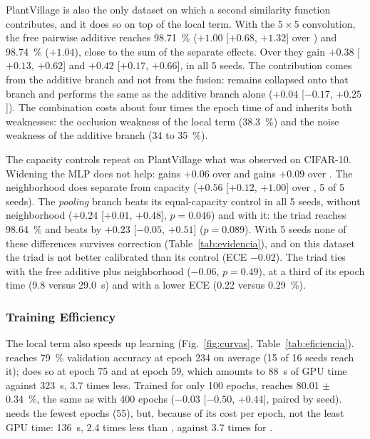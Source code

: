 PlantVillage is also the only dataset on which a second similarity function contributes, and it does so on top of the local term. With the $5\times5$ convolution, the free pairwise additive reaches 98.71~\% ($+1.00$ [$+0.68$, $+1.32$] over ) and  98.74~\% ($+1.04$), close to the sum of the separate effects. Over  they gain $+0.38$ [$+0.13$, $+0.62$] and $+0.42$ [$+0.17$, $+0.66$], in all 5 seeds. The contribution comes from the additive branch and not from the fusion:  remains collapsed onto that branch and performs the same as the additive branch alone ($+0.04$ [$-0.17$, $+0.25$]). The combination costs about four times the epoch time of  and inherits both weaknesses: the occlusion weakness of the local term (38.3~\%) and the noise weakness of the additive branch (34 to 35~\%).

The capacity controls repeat on PlantVillage what was observed on CIFAR-10. Widening the MLP does not help:  gains $+0.06$ over  and  gains $+0.09$ over . The neighborhood does separate from capacity ($+0.56$ [$+0.12$, $+1.00$] over , 5 of 5 seeds). The \emph{pooling} branch beats its equal-capacity control in all 5 seeds, without neighborhood ($+0.24$ [$+0.01$, $+0.48$], $p=0.046$) and with it: the triad reaches 98.64~\% and beats  by $+0.23$ [$-0.05$, $+0.51$] ($p=0.089$). With 5 seeds none of these differences survives correction (Table~\ref{tab:evidencia}), and on this dataset the triad is not better calibrated than its control (ECE $-0.02$). The triad ties with the free additive plus neighborhood ($-0.06$, $p=0.49$), at a third of its epoch time (9.8 versus 29.0~s) and with a lower ECE (0.22 versus 0.29~\%).



\subsubsection{Training Efficiency}
\label{sec:res-eficiencia}
The local term also speeds up learning (Fig.~\ref{fig:curvas}, Table~\ref{tab:eficiencia}).  reaches 79~\% validation accuracy at epoch 234 on average (15 of 16 seeds reach it);  does so at epoch 75 and  at epoch 59, which amounts to 88~s of GPU time against 323~s, 3.7 times less. Trained for only 100 epochs,  reaches 80.01 $\pm$ 0.34~\%, the same as  with 400 epochs ($-0.03$ [$-0.50$, $+0.44$], paired by seed).  needs the fewest epochs (55), but, because of its cost per epoch, not the least GPU time: 136~s, 2.4 times less than , against 3.7 times for .


